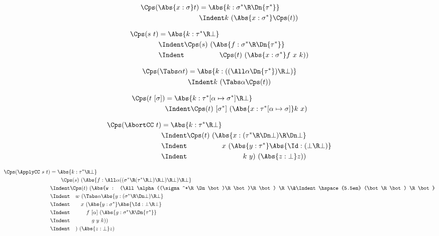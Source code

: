 \documentclass{amsart}
\begin{document}
\begin{align*}
\Cps(\Abs{x:\sigma}t)
& =
\Abs{k:\sigma^* \R \Dn{\tau^*}}
\\&\Indent
k~(\Abs{x:\sigma^*}\Cps(t))
\end{align*}

\begin{align*}
\Cps(s~t)
& =
\Abs{k:\tau^*\R\bot}
\\&\Indent
\Cps(s)~(\Abs{f:\sigma^* \R \Dn{\tau^*}}
\\&\Indent\hspace{5em}
\Cps(t)~(\Abs{x:\sigma^*}
f~x~k
))
\end{align*}

\begin{align*}
\Cps(\Tabs\alpha t)
& =
\Abs{k:((\All\alpha \Dn{\tau^*}) \R \bot)}
\\&\Indent
k~(\Tabs\alpha \Cps(t))
\end{align*}

\begin{align*}
\Cps(t~[\sigma])
& =
\Abs{k : \tau^*[\alpha\mapsto\sigma^*] \R \bot}
\\&\Indent
\Cps(t)~[\sigma^*]~(\Abs{x : \tau^*[\alpha\mapsto\sigma]} k~x)
\end{align*}

\begin{align*}
\Cps(\AbortCC~t)
& =
\Abs{k : \tau^*\R\bot}
\\&\Indent
\Cps(t)~(\Abs{x : (\tau^*\R\Dn\bot)\R\Dn\bot}
\\&\Indent\hspace{5em}
x~(\Abs{y : \tau^*} \Abs{\Id : (\bot\R\bot)}
\\&\Indent\hspace{8em}
k~y)~(\Abs{z : \bot}z))
\end{align*}

\begin{align*}
\Cps(\ApplyCC~s~t)
& =
\Abs{k : \tau^* \R \bot}
\\&\hspace{2em}
\Cps(s)~(\Abs{f : \All\alpha
  ((\sigma^*\R(\tau^*\R\bot)\R\bot)\R\bot)\R\bot}
\\&\Indent
\Cps(t)~(\Abs{w :
  (\All\alpha((\sigma^*\R \Dn\bot)\R\bot)\R\bot) \R
  \\&\Indent\hspace{5.5em}
  (\bot\R\bot) \R \bot}
\\&\Indent\hspace{1em}
w~(\Tabs\alpha \Abs{y :
  (\sigma^* \R \Dn\bot) \R \bot}
\\&\Indent\hspace{2em}
x~(\Abs{y : \sigma^*} \Abs{\Id : \bot \R \bot}
\\&\Indent\hspace{3em}
f~[\alpha]~(\Abs{g : \sigma^* \R \Dn{\tau^*}}
\\&\Indent\hspace{4em}
g~y~k))
\\&\Indent\hspace{1em}
)~(\Abs{z:\bot}z)
\end{align*}
\end{document}
